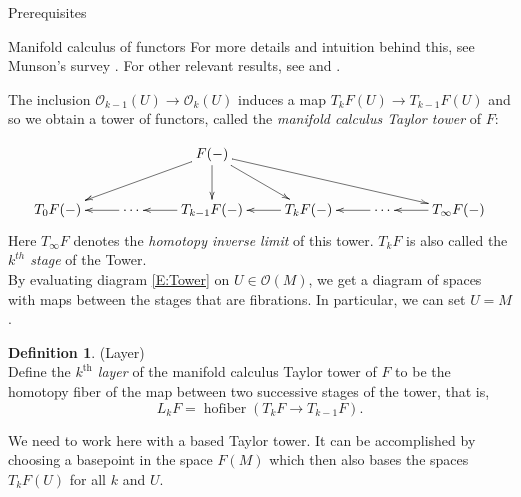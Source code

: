 \documentclass[12pt]{amsart}
\newcommand{\hofiber}{\operatorname{hofiber}}
\theoremstyle{plain}
\theoremstyle{definition}
\newtheorem{defin}[thm]{Definition}
\theoremstyle{remark}
\begin{document}
\begin{section}{Prerequisites}
\begin{subsection}{Manifold calculus of functors}
For more details and intuition behind this, see Munson's survey \cite{M:MfldCalc}. For other relevant results, see \cite[Theorem 10.2.16]{MV:Cubes} and \cite{W:EI1}.





The inclusion $\mathcal{O}_{k-1}(U) \rightarrow \mathcal{O}_k(U)$ induces a map $T_kF(U) \to T_{k-1}F(U)$ and so we obtain a tower of functors, called the \textit{manifold calculus Taylor tower} of $F$:

\begin{equation}\label{E:Tower}
\xymatrix{
&   &     F(-)   \ar[dll]\ar[d]\ar[dr]\ar[drrr]          &                      &               &      \\
T_{0}F(-)  & \ar[l] \cdots &   T_{k-1}F(-) \ar[l] &    T_{k}F(-) \ar[l]   & \ar[l] \cdots &   T_{\infty}F(-) \ar[l]                          
}%
\end{equation}
Here $T_{\infty}F$ denotes the \textit{homotopy inverse limit} of this tower. $T_k F$ is also called the \textit{$k^{th}$ stage} of the Tower.\\
By evaluating diagram \eqref{E:Tower} on $U \in \mathcal{O}(M)$, we get a diagram of spaces with maps between the stages that are fibrations. In particular, we can set $U=M$.
\begin{defin}(Layer)\\
Define the \textit{$k^{\text{th}}$ layer} of the manifold calculus Taylor tower of  $F$ to be the homotopy fiber of the map between two successive stages of the tower, that is, $$L_kF=\hofiber(T_kF \to T_{k-1}F).$$
\end{defin}
We need to work here with a based Taylor tower. It can be accomplished by choosing a basepoint in the space $F(M)$ which then also bases the spaces $T_kF(U)$ for all $k$ and $U$.


\end{subsection}
\end{section}
\end{document}
